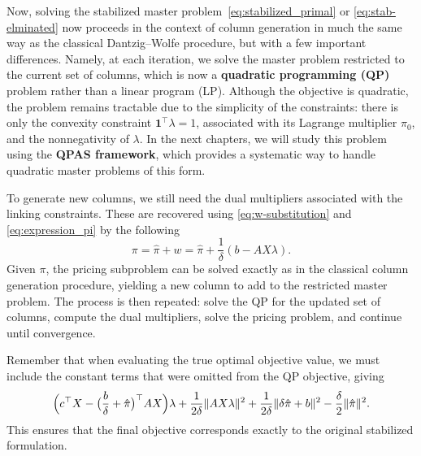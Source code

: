 \documentclass{book}
\theoremstyle{definition}
\numberwithin{algorithm_}{chapter}
\begin{document}
Now, solving the stabilized master problem~\eqref{eq:stabilized_primal} or \eqref{eq:stab-elminated} now proceeds in the context of column generation in much the same way as the classical Dantzig--Wolfe procedure, but with a few important differences. Namely, at each iteration, we solve the master problem restricted to the current set of columns, which is now a \textbf{quadratic programming (QP)} problem rather than a linear program (LP). Although the objective is quadratic, the problem remains tractable due to the simplicity of the constraints: there is only the convexity constraint $\mathbf{1}^\top \lambda = 1$, associated with its Lagrange multiplier $\pi_0$, and the nonnegativity of $\lambda$. In the next chapters, we will study this problem using the \textbf{QPAS framework}, which provides a systematic way to handle quadratic master problems of this form.

\bigskip

To generate new columns, we still need the dual multipliers associated with the linking constraints. These are recovered using \eqref{eq:w-substitution} and \eqref{eq:expression_pi} by the following
\begin{equation} \label{eq:pi_formula}
\pi = \hat{\pi} + w = \hat{\pi} + \frac{1}{\delta} (b - A X \lambda).
\end{equation}
Given $\pi$, the pricing subproblem can be solved exactly as in the classical column generation procedure, yielding a new column to add to the restricted master problem. The process is then repeated: solve the QP for the updated set of columns, compute the dual multipliers, solve the pricing problem, and continue until convergence.

\bigskip

Remember that when evaluating the true optimal objective value, we must include the constant terms that were omitted from the QP objective, giving
\[
\Bigl( c^\top X - \bigl( \frac{b}{\delta} + \hat{\pi} \bigr)^\top A X \Bigr) \lambda
+ \frac{1}{2\delta} \| A X \lambda \|^2
+ \frac{1}{2\delta} \| \delta \hat{\pi} + b \|^2
- \frac{\delta}{2} \| \hat{\pi} \|^2.
\]
This ensures that the final objective corresponds exactly to the original stabilized formulation.


\newpage
\end{document}
